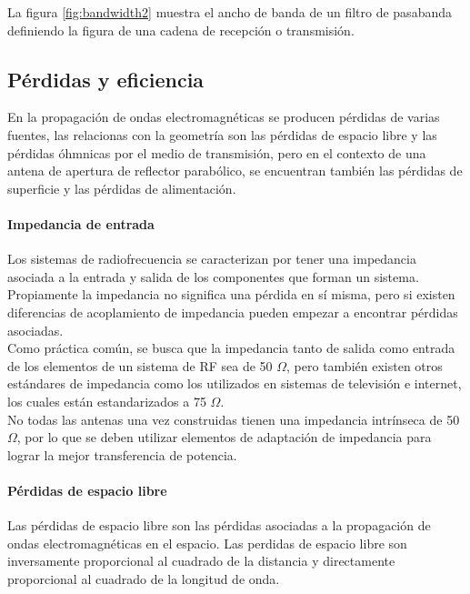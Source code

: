 La figura \ref{fig:bandwidth2} muestra el ancho de banda de un filtro de pasabanda definiendo la figura de una cadena de recepción o transmisión.\\


\subsection{Pérdidas y eficiencia}

En la propagación de ondas electromagnéticas se producen pérdidas de varias fuentes, las relacionas con la geometría son las pérdidas de espacio libre y las pérdidas óhmnicas por el medio de transmisión, pero en el contexto de una antena de apertura de reflector parabólico, se encuentran también las pérdidas de superficie y las pérdidas de alimentación.\\

\paragraph{Impedancia de entrada}

Los sistemas de radiofrecuencia se caracterizan por tener una impedancia asociada a la entrada y salida de los componentes que forman un sistema. Propiamente la impedancia no significa una pérdida en sí misma, pero si existen diferencias de acoplamiento de impedancia pueden empezar a encontrar pérdidas asociadas.\\

Como práctica común, se busca que la impedancia tanto de salida como entrada de los elementos de un sistema de RF sea de 50 $\Omega$, pero también existen otros estándares de impedancia como los utilizados en sistemas de televisión e internet, los cuales están estandarizados a 75 $\Omega$.\\

No todas las antenas una vez construidas tienen una impedancia intrínseca de 50 $\Omega$, por lo que se deben utilizar elementos de adaptación de impedancia para lograr la mejor transferencia de potencia.\\

\paragraph{Pérdidas de espacio libre}

Las pérdidas de espacio libre son las pérdidas asociadas a la propagación de ondas electromagnéticas en el espacio. Las perdidas de espacio libre son inversamente proporcional al cuadrado de la distancia y directamente proporcional al cuadrado de la longitud de onda.

